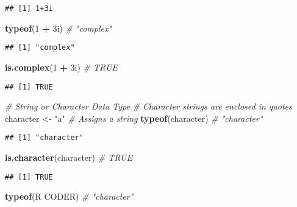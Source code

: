 \documentclass[
]{article}
\newenvironment{Shaded}{\begin{snugshade}}{\end{snugshade}}
\newcommand{\CommentTok}[1]{\textcolor[rgb]{0.56,0.35,0.01}{\textit{#1}}}
\newcommand{\DataTypeTok}[1]{\textcolor[rgb]{0.13,0.29,0.53}{#1}}
\newcommand{\DecValTok}[1]{\textcolor[rgb]{0.00,0.00,0.81}{#1}}
\newcommand{\FunctionTok}[1]{\textcolor[rgb]{0.13,0.29,0.53}{\textbf{#1}}}
\newcommand{\NormalTok}[1]{#1}
\newcommand{\OtherTok}[1]{\textcolor[rgb]{0.56,0.35,0.01}{#1}}
\newcommand{\SpecialCharTok}[1]{\textcolor[rgb]{0.81,0.36,0.00}{\textbf{#1}}}
\newcommand{\StringTok}[1]{\textcolor[rgb]{0.31,0.60,0.02}{#1}}
\begin{document}
\begin{verbatim}
## [1] 1+3i
\end{verbatim}

\begin{Shaded}
\begin{Highlighting}[]
\FunctionTok{typeof}\NormalTok{(}\DecValTok{1} \SpecialCharTok{+} \DecValTok{3}\DataTypeTok{i}\NormalTok{)        }\CommentTok{\# "complex"}
\end{Highlighting}
\end{Shaded}

\begin{verbatim}
## [1] "complex"
\end{verbatim}

\begin{Shaded}
\begin{Highlighting}[]
\FunctionTok{is.complex}\NormalTok{(}\DecValTok{1} \SpecialCharTok{+} \DecValTok{3}\DataTypeTok{i}\NormalTok{)    }\CommentTok{\# TRUE}
\end{Highlighting}
\end{Shaded}

\begin{verbatim}
## [1] TRUE
\end{verbatim}

\begin{Shaded}
\begin{Highlighting}[]
\CommentTok{\# String or Character Data Type}
\CommentTok{\# Character strings are enclosed in quotes}
\NormalTok{character }\OtherTok{\textless{}{-}} \StringTok{"a"}      \CommentTok{\# Assigns a string}
\FunctionTok{typeof}\NormalTok{(character)     }\CommentTok{\# "character"}
\end{Highlighting}
\end{Shaded}

\begin{verbatim}
## [1] "character"
\end{verbatim}

\begin{Shaded}
\begin{Highlighting}[]
\FunctionTok{is.character}\NormalTok{(character) }\CommentTok{\# TRUE}
\end{Highlighting}
\end{Shaded}

\begin{verbatim}
## [1] TRUE
\end{verbatim}

\begin{Shaded}
\begin{Highlighting}[]
\FunctionTok{typeof}\NormalTok{(}\StringTok{\textquotesingle{}R CODER\textquotesingle{}}\NormalTok{)     }\CommentTok{\# "character"}
\end{Highlighting}
\end{Shaded}
\end{document}
